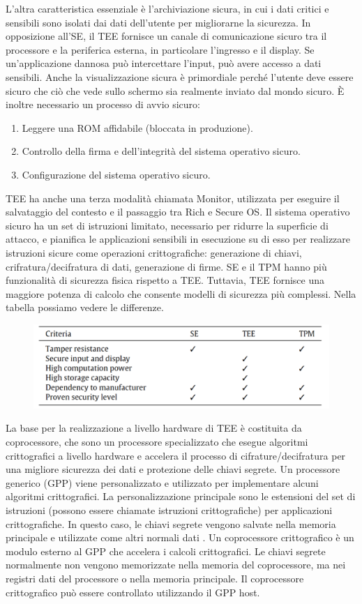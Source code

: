 L'altra caratteristica essenziale è l'archiviazione sicura, in cui i dati
critici e sensibili sono isolati dai dati dell'utente per migliorarne la
sicurezza. In opposizione all'SE, il TEE fornisce un canale di
comunicazione sicuro tra il processore e la periferica esterna, in
particolare l'ingresso e il display. Se un'applicazione dannosa può intercettare l'input, può avere
accesso a dati sensibili. Anche la visualizzazione sicura è primordiale
perché l'utente deve essere sicuro che ciò che vede sullo schermo
sia realmente inviato dal mondo sicuro.
È inoltre necessario un processo di avvio sicuro:
\begin{enumerate}
    \item Leggere una ROM affidabile (bloccata in produzione).
    \item Controllo della firma e dell'integrità del sistema operativo sicuro.
    \item Configurazione del sistema operativo sicuro.
\end{enumerate}
TEE ha anche una terza modalità chiamata Monitor, utilizzata per
eseguire il salvataggio del contesto e il passaggio tra Rich e Secure OS. Il sistema operativo sicuro ha un set di istruzioni limitato,
necessario per ridurre la superficie di attacco, e pianifica le
applicazioni sensibili in esecuzione su di esso per realizzare
istruzioni sicure come operazioni crittografiche: generazione di
chiavi, crifratura/decifratura di dati, generazione di firme.
SE e il TPM hanno più funzionalità di sicurezza fisica rispetto a
TEE. Tuttavia, TEE fornisce una maggiore potenza di calcolo che
consente modelli di sicurezza più complessi. Nella tabella possiamo vedere le differenze.

\begin{figure}[htb!]
    \centering
    \includegraphics[width=12cm]{./Images/cap6/6.5.png}
\end{figure}

La base per la realizzazione a livello hardware di
TEE è costituita da coprocessore, che sono un
processore specializzato che esegue algoritmi
crittografici a livello hardware e accelera il
processo di cifrature/decifratura per una migliore
sicurezza dei dati e protezione delle chiavi
segrete.
Un processore generico (GPP) viene personalizzato e utilizzato
per implementare alcuni algoritmi crittografici. La personalizzazione principale sono le estensioni del set di istruzioni (possono
essere chiamate istruzioni crittografiche) per applicazioni
crittografiche. In questo caso, le chiavi segrete vengono salvate
nella memoria principale e utilizzate come altri normali dati
. Un coprocessore crittografico è un modulo esterno al
GPP che accelera i calcoli crittografici. Le chiavi segrete
normalmente non vengono memorizzate nella memoria
del coprocessore, ma nei registri dati del processore o
nella memoria principale. Il coprocessore crittografico
può essere controllato utilizzando il GPP host.

